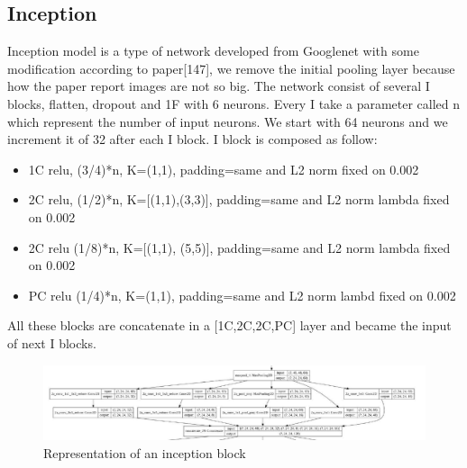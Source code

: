 \documentclass[10pt,twocolumn,letterpaper]{article}
\begin{document}
\subsection*{Inception}
Inception model is a type of network developed from Googlenet \cite{13} with some modification according to paper[147], we remove the initial pooling layer because how the paper report \cite{147} images are not so big. 
The network consist of several I blocks, flatten, dropout and 1F with 6 neurons. Every I take a parameter called n which represent the number of input neurons. 
We start with 64 neurons and we increment it of 32 after each I block. I block is composed as follow:
\begin{itemize}[noitemsep]%
\item 1C relu, (3/4)*n, K=(1,1), padding=same and L2 norm fixed on 0.002
\item 2C relu, (1/2)*n, K=[(1,1),(3,3)], padding=same and L2 norm lambda fixed on 0.002
\item 2C relu (1/8)*n, K=[(1,1), (5,5)], padding=same and L2 norm lambda fixed on 0.002
\item PC relu (1/4)*n, K=(1,1), padding=same and L2 norm lambd fixed on 0.002
\end{itemize}
All these blocks are concatenate in a [1C,2C,2C,PC] layer and became the input of next I blocks.
\begin{figure}[h]
   \includegraphics[width=1\linewidth]{./immagini/inception.jpg}
   \caption{Representation of an inception block}
\end{figure}
\end{document}

